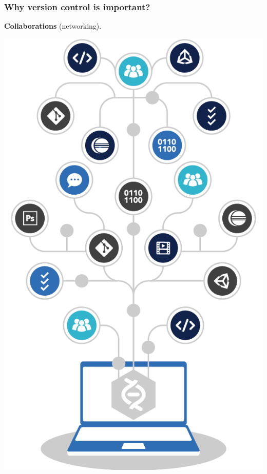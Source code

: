 \documentclass[svgnames]{beamer}
\begin{document}
\begin{frame}
\frametitle{Why version control is important?}
\textbf{Collaborations} (networking).

\begin{center}
\includegraphics[scale=0.20]{img/networking.png}
\end{center}

\end{frame}
\end{document}
